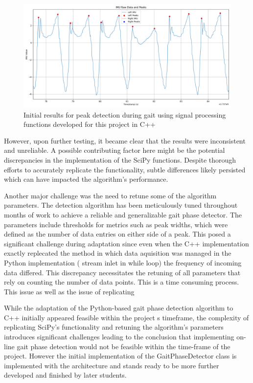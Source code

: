\begin{figure}
    \centering
    \includegraphics[width=0.95\linewidth]{images/peaks_wz_13.12.24.png}
    \caption{Initial results for peak detection during gait using signal processing functions developed for this project in C++}
    \label{fig:peaks}
\end{figure}

However, upon further testing, it became clear that the results were inconsistent and unreliable. A possible contributing factor here might be the potential discrepancies in the implementation of the SciPy functions. Despite thorough efforts to accurately replicate the functionality, subtle differences likely persisted which can have impacted the algorithm's performance. 

Another major challenge was the need to retune some of the algorithm parameters. The detection algorithm has been meticulously tuned throughout months of work to achieve a reliable and generalizable gait phase detector. The parameters include thresholds for metrics such as peak widths, which were defined as the number of data entries on either side of a peak. This posed  a significant challenge during adaptation since even when the C++ implementation exactly replecated the method in which data aquisition was managed in the Python implementation ( stream inlet in while loop) the frequency of incoming data differed. This discrepancy necessitates the retuning of all parameters that rely on counting the number of data points. This is a time consuming process. This issue as well as the issue of replicating 

While the adaptation of the Python-based gait phase detection algorithm to C++ initially appeared feasible within the project
s timeframe, the complexity of replicating SciPy's functionality and retuning the algorithm's parameters introduces significant challenges leading to the conclusion that implementing on-line gait phase detection would not be feasible within the time-frame of the project. However the initial implementation of the GaitPhaseDetector class is implemented with the architecture and stands ready to be more further developed and finished by later students.


